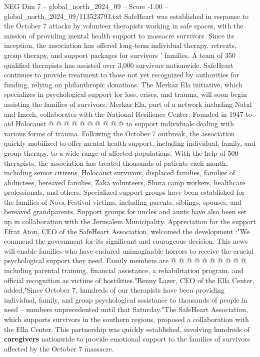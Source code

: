 \begin{textsample}{NEG Dim 7 – global\_north\_2024\_09 – Score -1.00 – global\_north\_2024\_09/113523793.txt}
SafeHeart was established in response to the October 7 attacks by volunteer therapists working in safe spaces, with the mission of providing mental health support to massacre survivors.
Since its inception, the association has offered long-term individual therapy, retreats, group therapy, and support packages for survivors ' families.
A team of 350 qualified therapists has assisted over 3,000 survivors nationwide.
SafeHeart continues to provide treatment to those not yet recognized by authorities for funding, relying on philanthropic donations.
The Merkaz Ela initiative, which specializes in psychological support for loss, crises, and trauma, will soon begin assisting the families of survivors.
Merkaz Ela, part of a network including Natal and Imech, collaborates with the National Resilience Center.
Founded in 1947 to aid Holocaust @ @ @ @ @ @ @ @ @ @ to support individuals dealing with various forms of trauma.
Following the October 7 outbreak, the association quickly mobilized to offer mental health support, including individual, family, and group therapy, to a wide range of affected populations.
With the help of 500 therapists, the association has treated thousands of patients each month, including senior citizens, Holocaust survivors, displaced families, families of abductees, bereaved families, Zaka volunteers, Shura camp workers, healthcare professionals, and others.
Specialized support groups have been established for the families of Nova Festival victims, including parents, siblings, spouses, and bereaved grandparents.
Support groups for uncles and aunts have also been set up in collaboration with the Jerusalem Municipality.
Appreciation for the support Efrat Aton, CEO of the SafeHeart Association, welcomed the development :"We commend the government for its significant and courageous decision.
This news will enable families who have endured unimaginable horrors to receive the crucial psychological support they need.
Family members are @ @ @ @ @ @ @ @ @ @ including parental training, financial assistance, a rehabilitation program, and official recognition as victims of hostilities."Benny Lazer, CEO of the Ella Center, added,"Since October 7, hundreds of our therapists have been providing individual, family, and group psychological assistance to thousands of people in need -- numbers unprecedented until that Saturday."The SafeHeart Association, which supports survivors in the southern regions, proposed a collaboration with the Ella Center.
This partnership was quickly established, involving hundreds of \textbf{caregivers} nationwide to provide emotional support to the families of survivors affected by the October 7 massacre.

\end{textsample}
